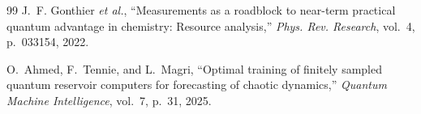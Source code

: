 \begin{thebibliography}{99}
J.~F. Gonthier \emph{et al.}, ``Measurements as a roadblock to near-term practical quantum advantage in chemistry: Resource analysis,'' \emph{Phys. Rev. Research}, vol.~4, p.~033154, 2022.

O.~Ahmed, F.~Tennie, and L.~Magri, ``Optimal training of finitely sampled quantum reservoir computers for forecasting of chaotic dynamics,'' \emph{Quantum Machine Intelligence}, vol.~7, p.~31, 2025.

\end{thebibliography}
